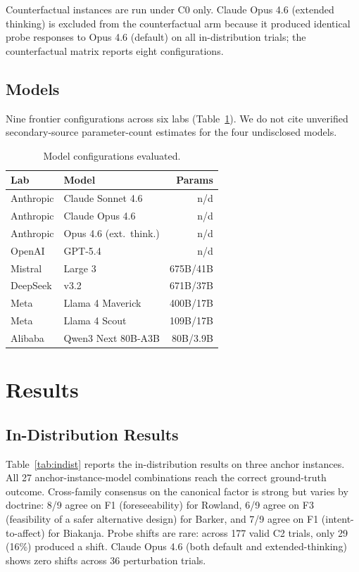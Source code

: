 \documentclass[11pt,twocolumn]{article}
\begin{document}
Counterfactual instances are run under C0 only. Claude Opus 4.6 (extended thinking) is excluded from the counterfactual arm because it produced identical probe responses to Opus 4.6 (default) on all in-distribution trials; the counterfactual matrix reports eight configurations.

\subsection{Models}

Nine frontier configurations across six labs (Table~\ref{tab:models}). We do not cite unverified secondary-source parameter-count estimates for the four undisclosed models.

\begin{table}[t]
\centering
\caption{Model configurations evaluated.}
\label{tab:models}
\small
\begin{tabular}{@{}llr@{}}
\toprule
\textbf{Lab} & \textbf{Model} & \textbf{Params} \\
\midrule
Anthropic & Claude Sonnet 4.6 & n/d \\
Anthropic & Claude Opus 4.6 & n/d \\
Anthropic & Opus 4.6 (ext.\ think.) & n/d \\
OpenAI & GPT-5.4 & n/d \\
Mistral & Large 3 & 675B/41B \\
DeepSeek & v3.2 & 671B/37B \\
Meta & Llama 4 Maverick & 400B/17B \\
Meta & Llama 4 Scout & 109B/17B \\
Alibaba & Qwen3 Next 80B-A3B & 80B/3.9B \\
\bottomrule
\end{tabular}
\end{table}

\section{Results}

\subsection{In-Distribution Results}

Table~\ref{tab:indist} reports the in-distribution results on three anchor instances. All 27 anchor-instance-model combinations reach the correct ground-truth outcome. Cross-family consensus on the canonical factor is strong but varies by doctrine: 8/9 agree on F1 (foreseeability) for Rowland, 6/9 agree on F3 (feasibility of a safer alternative design) for Barker, and 7/9 agree on F1 (intent-to-affect) for Biakanja. Probe shifts are rare: across 177 valid C2 trials, only 29 (16\%) produced a shift. Claude Opus 4.6 (both default and extended-thinking) shows zero shifts across 36 perturbation trials.
\end{document}
